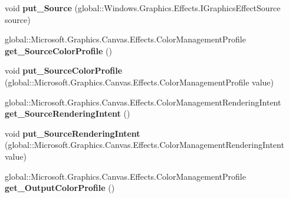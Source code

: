 \begin{DoxyCompactItemize}
void {\bfseries put\+\_\+\+Source} (global\+::\+Windows.\+Graphics.\+Effects.\+I\+Graphics\+Effect\+Source source)
\item 
\mbox{\label{interface_microsoft_1_1_graphics_1_1_canvas_1_1_effects_1_1_i_color_management_effect_ab5d6882071f30c0d22c6206687b4b83b}} 
global\+::\+Microsoft.\+Graphics.\+Canvas.\+Effects.\+Color\+Management\+Profile {\bfseries get\+\_\+\+Source\+Color\+Profile} ()
\item 
\mbox{\label{interface_microsoft_1_1_graphics_1_1_canvas_1_1_effects_1_1_i_color_management_effect_aa757b92037b6dabd9bf623a16c5dd4e6}} 
void {\bfseries put\+\_\+\+Source\+Color\+Profile} (global\+::\+Microsoft.\+Graphics.\+Canvas.\+Effects.\+Color\+Management\+Profile value)
\item 
\mbox{\label{interface_microsoft_1_1_graphics_1_1_canvas_1_1_effects_1_1_i_color_management_effect_aa7388e8ab03296386d33f1faf0617131}} 
global\+::\+Microsoft.\+Graphics.\+Canvas.\+Effects.\+Color\+Management\+Rendering\+Intent {\bfseries get\+\_\+\+Source\+Rendering\+Intent} ()
\item 
\mbox{\label{interface_microsoft_1_1_graphics_1_1_canvas_1_1_effects_1_1_i_color_management_effect_aa7e9dbcbb6bca52b58c9c59dea51a272}} 
void {\bfseries put\+\_\+\+Source\+Rendering\+Intent} (global\+::\+Microsoft.\+Graphics.\+Canvas.\+Effects.\+Color\+Management\+Rendering\+Intent value)
\item 
\mbox{\label{interface_microsoft_1_1_graphics_1_1_canvas_1_1_effects_1_1_i_color_management_effect_a6fac8f330f6ff6d98ef14cef1e6f5663}} 
global\+::\+Microsoft.\+Graphics.\+Canvas.\+Effects.\+Color\+Management\+Profile {\bfseries get\+\_\+\+Output\+Color\+Profile} ()
\item 
\mbox{\label{interface_microsoft_1_1_graphics_1_1_canvas_1_1_effects_1_1_i_color_management_effect_a9dd341e021ce085924bf27decaeaaf6e}} 

\end{DoxyCompactItemize}
